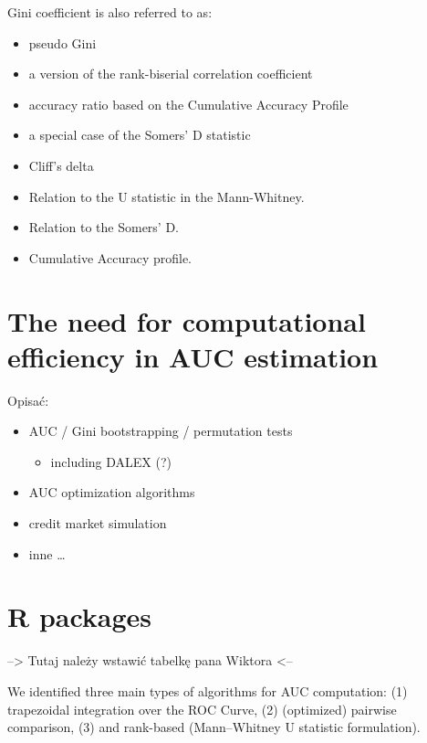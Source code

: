 Gini coefficient is also referred to as:

\begin{itemize}
\item
  pseudo Gini \citep{Idczak_2019}
\item
  a version of the rank-biserial correlation coefficient
\item
  accuracy ratio based on the Cumulative Accuracy Profile
\item
  a special case of the Somers' D statistic
\item
  Cliff's delta \citep{Cliff_1993}
\item
  Relation to the U statistic in the Mann-Whitney.
\item
  Relation to the Somers' D.
\item
  Cumulative Accuracy profile.
\end{itemize}

\section{The need for computational efficiency in AUC estimation}\label{the-need-for-computational-efficiency-in-auc-estimation}

Opisać:

\begin{itemize}
\item
  AUC / Gini bootstrapping / permutation tests

  \begin{itemize}
  \tightlist
  \item
    including DALEX (?)
  \end{itemize}
\item
  AUC optimization algorithms
\item
  credit market simulation
\end{itemize}

\citep{Kochanski_2021}

\begin{itemize}
\tightlist
\item
  inne \ldots{}
\end{itemize}

\section{R packages}\label{r-packages}

--\textgreater{} Tutaj należy wstawić tabelkę pana Wiktora \textless--

We identified three main types of algorithms for AUC computation: (1) trapezoidal integration over the ROC Curve, (2) (optimized) pairwise comparison, (3) and rank-based (Mann--Whitney U statistic formulation).

